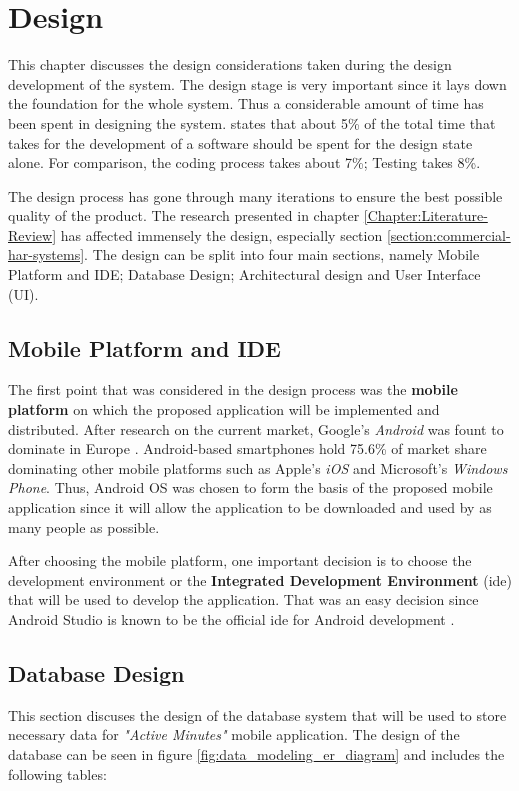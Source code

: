 \chapter{Design}
\label{Chapter:Design}

This chapter discusses the design considerations taken during the design development of the system. The design stage is very important since it lays down the foundation for the whole system.
Thus a considerable amount of time has been spent in designing the system. \citet[12]{bell2005} states that about 5\% of the total time that takes for the development of a software should be spent for the design state alone. For comparison, the coding process takes about 7\%; Testing takes 8\%. 

The design process has gone through many iterations to ensure the best possible quality of the product. The research presented in chapter \ref{Chapter:Literature-Review} has affected immensely the design, especially section \ref{section:commercial-har-systems}. The design can be split into four main sections, namely Mobile Platform and IDE; Database Design; Architectural design and User Interface (UI).

    \section{Mobile Platform and IDE}
        The first point that was considered in the design process was the \textbf{mobile platform} on which the proposed application will be implemented and distributed. After research on the current market, Google's \textit{Android} was fount to dominate in Europe \citep{williams2016}. Android-based smartphones hold 75.6\% of market share dominating other mobile platforms such as Apple's \textit{iOS} and Microsoft's \textit{Windows Phone}. Thus, Android OS was chosen to form the basis of the proposed mobile application since it will allow the application to be downloaded and used by as many people as possible.
        
        After choosing the mobile platform, one important decision is to choose the development environment or the \textbf{Integrated Development Environment} (\gls{ide}) that will be used to develop the application. That was an easy decision since Android Studio is known to be the official \gls{ide} for Android development \citep{androidstudio2017}.

    \section{Database Design}
    This section discuses the design of the database system that will be used to store necessary data for \textit{"Active Minutes"} mobile application. The design of the database can be seen in figure \ref{fig:data_modeling_er_diagram} and includes the following tables:
    
